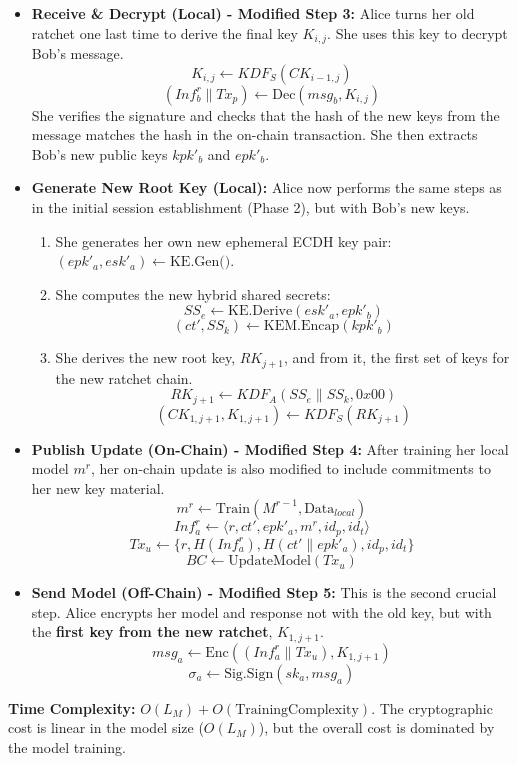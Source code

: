 \documentclass[12pt]{article}
\begin{document}
\begin{itemize}
    \item \textbf{Receive \& Decrypt (Local) - Modified Step 3:} Alice turns her old ratchet one last time to derive the final key \( K_{i,j} \). She uses this key to decrypt Bob's message.
    \[ K_{i,j} \leftarrow KDF_S(CK_{i-1,j}) \]
    \[ (Inf_b^r \parallel Tx_p) \leftarrow \text{Dec}(msg_b, K_{i,j}) \]
    She verifies the signature and checks that the hash of the new keys from the message matches the hash in the on-chain transaction. She then extracts Bob's new public keys \( kpk'_b \) and \( epk'_b \).
    
    \item \textbf{Generate New Root Key (Local):} Alice now performs the same steps as in the initial session establishment (Phase 2), but with Bob's new keys.
    \begin{enumerate}
        \item She generates her own new ephemeral ECDH key pair: \( (epk'_a, esk'_a) \leftarrow \text{KE.Gen()} \).
        \item She computes the new hybrid shared secrets:
        \[ SS_e \leftarrow \text{KE.Derive}(esk'_a, epk'_b) \]
        \[ (ct', SS_k) \leftarrow \text{KEM.Encap}(kpk'_b) \]
        \item She derives the new root key, \( RK_{j+1} \), and from it, the first set of keys for the new ratchet chain.
        \[ RK_{j+1} \leftarrow KDF_A(SS_e \parallel SS_k, 0x00) \]
        \[ (CK_{1,j+1}, K_{1,j+1}) \leftarrow KDF_S(RK_{j+1}) \]
    \end{enumerate}
    
    \item \textbf{Publish Update (On-Chain) - Modified Step 4:} After training her local model \( m^r \), her on-chain update is also modified to include commitments to her new key material.
    \[ m^r \leftarrow \text{Train}(M^{r-1}, \text{Data}_{local}) \]
    \[ Inf_a^r \leftarrow \langle r, ct', epk'_a, m^r, id_p, id_t \rangle \]
    \[ Tx_u \leftarrow \{ r, H(Inf_a^r), H(ct' \parallel epk'_a), id_p, id_t \} \]
    \[ BC \leftarrow \text{UpdateModel}(Tx_u) \]
    
    \item \textbf{Send Model (Off-Chain) - Modified Step 5:} This is the second crucial step. Alice encrypts her model and response not with the old key, but with the \textbf{first key from the new ratchet}, \( K_{1,j+1} \).
    \[ msg_a \leftarrow \text{Enc}((Inf_a^r \parallel Tx_u), K_{1,j+1}) \]
    \[ \sigma_a \leftarrow \text{Sig.Sign}(sk_a, msg_a) \]
\end{itemize}
\textbf{Time Complexity:} \( O(L_M) + O(\text{TrainingComplexity}) \). The cryptographic cost is linear in the model size (\(O(L_M)\)), but the overall cost is dominated by the model training.
\end{document}
